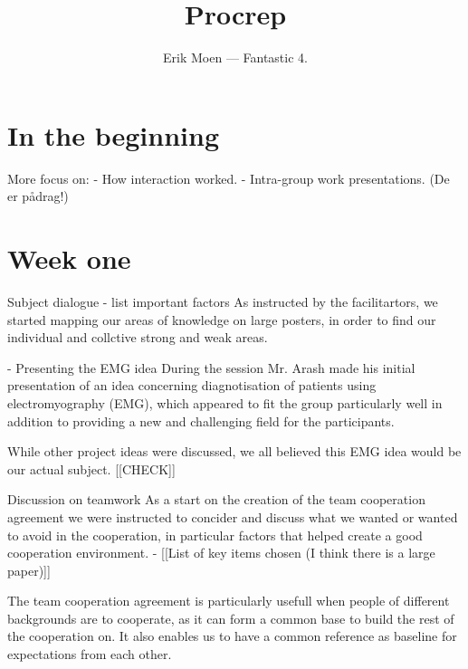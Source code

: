 \documentclass[a4paper, oneside, fleqn, halfparskip]{scrartcl}
\begin{document}
\title{Procrep}
\subject{Homo Mobilis — Eksperter i Team}
\author{Erik Moen — Fantastic 4.}
\maketitle

\section{In the beginning}

More focus on:
- How interaction worked.
- Intra-group work presentations. (De er pådrag!)

\section{Week one}

Subject dialogue
- list important factors
As instructed by the facilitartors, we started mapping our areas of knowledge on large posters, in order to find our individual and collctive strong and weak areas.

- Presenting the EMG idea
During the session Mr. Arash made his initial presentation of an idea concerning diagnotisation of patients using electromyography (EMG), which appeared to fit the group particularly well in addition to providing a new and challenging field for the participants. 

While other project ideas were discussed, we all believed this EMG idea would be our actual subject. [[CHECK]]

Discussion on teamwork
As a start on the creation of the team cooperation agreement we were instructed to concider and discuss what we wanted or wanted to avoid in the cooperation, in particular factors that helped create a good cooperation environment.
- [[List of key items chosen (I think there is a large paper)]]


The team cooperation agreement is particularly usefull when people of different backgrounds are to cooperate, as it can form a common base to build the rest of the cooperation on. It also enables us to have a common reference as baseline for expectations from each other.
\end{document}
